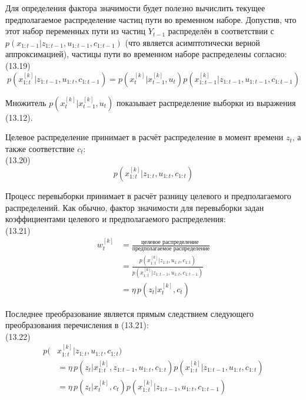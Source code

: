 \documentclass[10pt,a4paper]{article}
\begin{document}
Для определения фактора значимости будет полезно вычислить текущее предполагаемое распределение частиц пути во временном наборе. Допустив, что этот набор переменных пути из частиц $Y_{t-1}$ распределён в соответствии с $p(x_{1:t-1} | z_{1:t-1}, u_{1:t-1}, c_{1:t-1})$ (что является асимптотически верной аппроксимацией), частицы пути во временном наборе распределены согласно:\\

(13.19)
$$p(x_{1:t}^{[k]}|z_{1:t-1},u_{1:t},c_{1:t-1})=p(x_t^{[k]}|x_{t-1}^{[k]},u_t)p(x_{1:t-1}^{[k]}|z_{1:t-1},u_{1:t-1},c_{1:t-1})$$

Множитель $p(x_t^{[k]}|x_{t-1}^{[k]},u_t)$ показывает распределение выборки из выражения (13.12).

Целевое распределение принимает в расчёт распределение в момент времени $z_t$, а также соответствие $c_t$:\\

(13.20)
$$p(x_{1:t}^{[k]}|z_{1:t},u_{1:t},c_{1:t})$$

Процесс перевыборки принимает в расчёт разницу целевого и предполагаемого распределений.   Как обычно,  фактор значимости для перевыборки задан коэффициентами целевого и предполагаемого распределения:\\

(13.21)
\begin{equation*}
\begin{split}
w_t^{[k]}&=\frac{\text{целевое распределение }}{\text{предполагаемое распределение}}\\
&=\frac{p(x_{1:t}^{[k]}|z_{1:t},u_{1:t},c_{1:t})}{p(x_{1:t}^{[k]}|z_{1:t-1},u_{1:t},c_{1:t-1})}\\
&=\eta\,p(z_t|x_t^{[k]},c_t)
\end{split}
\end{equation*}

Последнее преобразование является прямым следствием следующего преобразования перечисления в (13.21):\\

(13.22)
\begin{equation*}
\begin{split}
p(&x_{1:t}^{[k]}|z_{1:t},u_{1:t},c_{1:t})\\
&=\eta\,p(z_t|x_{1:t}^{[k]},z_{1:t-1},u_{1:t},c_{1:t})p(x_{1:t}^{[k]}|z_{1:t-1},u_{1:t},c_{1:t})\\
&=\eta\,p(z_t|x_t^{[k]},c_t)p(x_{1:t}^{[k]}|z_{1:t-1},u_{1:t},c_{1:t-1})
\end{split}
\end{equation*}
\end{document}
